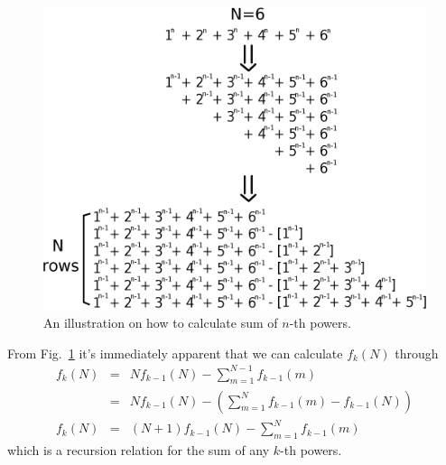 \documentclass[aps,preprint,preprintnumbers,nofootinbib,showpacs,prd]{revtex4-1}
\newcommand{\nbea}{\begin{eqnarray*}}
\newcommand{\neea}{\end{eqnarray*}}
\begin{document}
\begin{figure}
\begin{center}
  \includegraphics[scale=0.55]{n-squared-plots/n_squared_sum_box_2.eps}
\end{center}
  \caption{\label{fig:sum-sq-2}
An illustration on how to calculate sum of $n$-th powers.}
\end{figure}
%

From Fig.~\ref{fig:sum-sq-2} it's immediately apparent that we can calculate $f_k(N)$ through
%
\nbea
f_k(N) & = & N f_{k-1}(N) - \sum_{m=1}^{N-1} f_{k-1}(m) \\
& = & N f_{k-1}(N) - \left ( \sum_{m=1}^{N} f_{k-1}(m)  - f_{k-1}(N) \right ) \\
f_k(N) & = & (N+1) f_{k-1}(N) - \sum_{m=1}^{N} f_{k-1}(m)
\neea
%
which is a recursion relation for the sum of any $k$-th powers.
\end{document}
